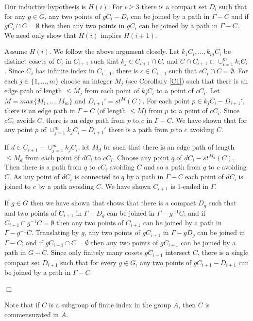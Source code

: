 \documentclass[12pt]{article}
\newenvironment{proof}{\addvspace{12pt}\noindent{\bf Proof:}}{
$\Box$\par\addvspace{12pt}}
\begin{document}
\begin{proof}
Our inductive hypothesis is $H(i)$: For $i\geq 3$ there is a compact set $D_i$ such that for any $g\in G$, any two points of  $gC_i-D_i$ can be joined by a path in $\Gamma-C$ and if $gC_i\cap C=\emptyset$ then then any two points in $gC_i$ can be joined by a path in $\Gamma-C$. We need only show that $H(i)$ implies $H(i+1)$. 

Assume $H(i)$. We follow the above argument closely.  Let $k_1C_i, \ldots, k_mC_i$ be distinct cosets of $C_i$ in $C_{i+1}$ such that  $k_j\in C_{i+1}\cap C$, and $C\cap C_{i+1}\subset \cup_{i=1}^m k_iC_{i}$. Since $C_i$ has infinite index in $C_{i+1}$, there is $c\in C_{i+1}$ such that $cC_i\cap C=\emptyset$.  For each $j\in \{1,\ldots, m\}$ choose an integer $M_j$ (see Corollary \ref{C1}) such that there is an edge path of length $\leq M_j$ from each point of $k_jC_i$ to a point of $cC_i$. Let $M=max\{M_1,\ldots, M_m\}$ and $D_{i+1}'=st^M(C)$. For each point $p\in k_jC_i-D_{i+1}'$, there is an edge path in $\Gamma-C$ (of length $\leq M$) from $p$ to a point of $cC_i$. Since $cC_i$ avoids $C$, there is an edge path from $p$ to $c$ in $\Gamma-C$. We have shown that for any point $p$ of $\cup_{j=1}^mk_jC_i-D_{i+1}'$ there is a path from $p$ to $c$ avoiding $C$.

If $d\in C_{i+1}-\cup _{j=1}^mk_jC_i$, let $M_d$ be such that there is an edge path of length $\leq M_d$ from each point of $dC_i$ to $cC_i$. Choose any point $q$ of $dC_i-st^{M_d}(C)$. Then there is a path from $q$ to $cC_i$ avoiding $C$ and so a path from $q$ to $c$ avoiding $C$. As any point of $dC_i$ is connected to $q$ by a path in $\Gamma-C$  each point of $dC_i$ is joined to $c$ by a path avoiding $C$. We have shown $C_{i+1}$ is 1-ended in $\Gamma$. 

If $g\in G$ then we have shown that shows that there is a compact $D_g$ such that and two points of  $C_{i+1}$ in $\Gamma-D_g$ can be joined in $\Gamma-g^{-1}C$; and if $C_{i+1}\cap g^{-1}C=\emptyset$ then any two points of $C_{i+1}$ can be joined by a path in $\Gamma-g^{-1}C$. Translating by $g$, any two points of $gC_{i+1}$ in $\Gamma-gD_g$ can be joined in $\Gamma-C$; and if $gC_{i+1}\cap C=\emptyset$ then any two points of $gC_{i+1}$ can be joined by a path in $G-C$. Since only finitely many cosets $gC_{i+1}$ intersect $C$, there is a single compact set $D_{i+1}$ such that for every $g\in G$, any two points of $gC_{i+1}-D_{i+1}$ can be joined by a path in $\Gamma-C$.
\end{proof}

Note that if $C$ is a subgroup of finite index in the group $A$, then $C$ is commensurated in $A$. 
\end{document}
